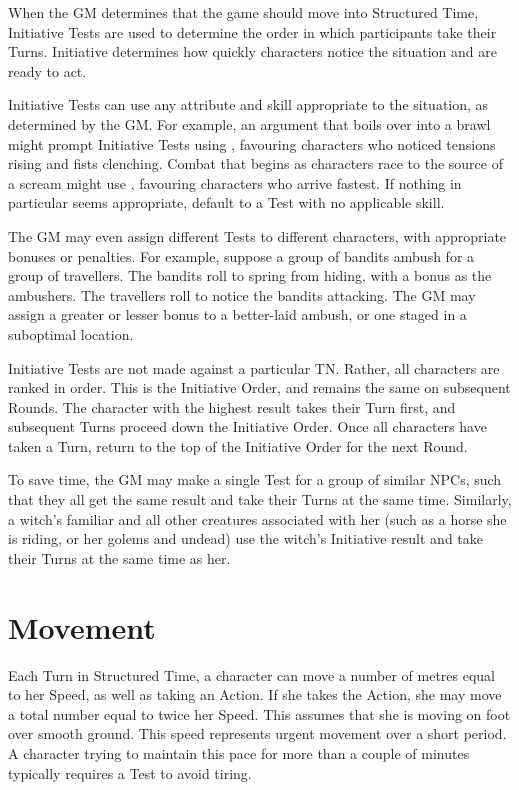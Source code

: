 When the GM determines that the game should move into Structured Time, Initiative Tests are used to determine the order in which participants take their Turns.
Initiative determines how quickly characters notice the situation and are ready to act.

Initiative Tests can use any attribute and skill appropriate to the situation, as determined by the GM.
For example, an argument that boils over into a brawl might prompt Initiative Tests using , favouring characters who noticed tensions rising and fists clenching.
Combat that begins as characters race to the source of a scream might use , favouring characters who arrive fastest.
If nothing in particular seems appropriate, default to a  Test with no applicable skill.

The GM may even assign different Tests to different characters, with appropriate bonuses or penalties.
For example, suppose a group of bandits ambush for a group of travellers.
The bandits roll  to spring from hiding, with a  bonus as the ambushers.
The travellers roll  to notice the bandits attacking.
The GM may assign a greater or lesser bonus to a better-laid ambush, or one staged in a suboptimal location.

Initiative Tests are not made against a particular TN.
Rather, all characters are ranked in order.
This is the Initiative Order, and remains the same on subsequent Rounds.
The character with the highest result takes their Turn first, and subsequent Turns proceed down the Initiative Order.
Once all characters have taken a Turn, return to the top of the Initiative Order for the next Round.

To save time, the GM may make a single Test for a group of similar NPCs, such that they all get the same result and take their Turns at the same time.
Similarly, a witch's familiar and all other creatures associated with her (such as a horse she is riding, or her golems and undead) use the witch's Initiative result and take their Turns at the same time as her.

\section{Movement}

Each Turn in Structured Time, a character can move a number of metres equal to her Speed, as well as taking an Action.
If she takes the  Action, she may move a total number equal to twice her Speed.
This assumes that she is moving on foot over smooth ground.
This speed represents urgent movement over a short period.
A character trying to maintain this pace for more than a couple of minutes typically requires a  Test to avoid tiring.

